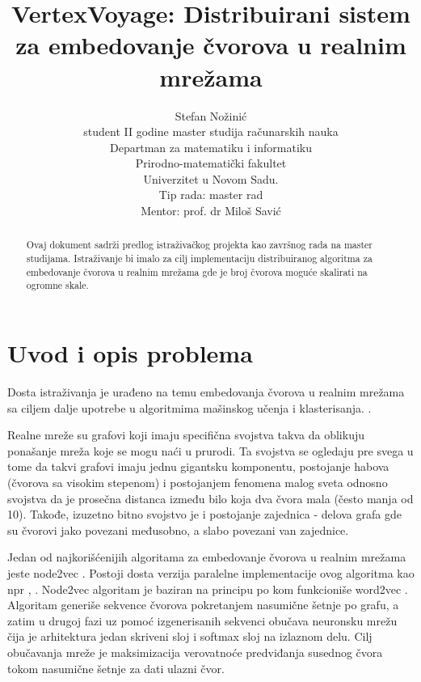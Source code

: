 \documentclass[]{amsart}
\begin{document}
\title{VertexVoyage: Distribuirani sistem za embedovanje čvorova u realnim mrežama}
\author{Stefan Nožinić \\
student II godine master studija računarskih nauka \\
Departman za matematiku i informatiku \\
Prirodno-matematički fakultet \\
Univerzitet u Novom Sadu. \\
Tip rada: master rad \\
Mentor: \MakeLowercase{prof. dr} Miloš Savić
}

\begin{abstract}
    Ovaj dokument sadrži predlog istraživačkog projekta kao završnog rada na master studijama.
    Istraživanje bi imalo za cilj implementaciju distribuiranog algoritma za embedovanje čvorova u realnim mrežama gde je broj čvorova moguće skalirati na ogromne skale.
\end{abstract}


\maketitle
\newpage


\section{Uvod i opis problema}
\label{sec:introduction}

Dosta istraživanja je urađeno na temu embedovanja čvorova u realnim mrežama 
sa ciljem dalje upotrebe u algoritmima mašinskog učenja i klasterisanja. \cite{grover2016node2vec}.

Realne mreže su grafovi koji imaju specifična svojstva takva da oblikuju ponašanje mreža koje se mogu naći u prurodi. Ta svojstva se ogledaju pre svega u tome da takvi grafovi imaju jednu gigantsku komponentu, postojanje habova (čvorova sa visokim stepenom) i postojanjem fenomena malog sveta odnosno svojstva da je prosečna distanca između bilo koja dva čvora mala (često manja od 10). Takođe, izuzetno bitno svojstvo je i postojanje zajednica - delova grafa gde su čvorovi jako povezani međusobno, a slabo povezani van zajednice. 

Jedan od najkorišćenijih algoritama za embedovanje čvorova u realnim mrežama jeste node2vec \cite{grover2016node2vec}. Postoji dosta verzija paralelne implementacije ovog algoritma kao npr \cite{lombardo2019actornode2vec}, \cite{fang2023distributed}. Node2vec algoritam je baziran na principu po kom funkcioniše word2vec \cite{church2017word2vec}. Algoritam generiše sekvence čvorova pokretanjem nasumične šetnje po grafu, a zatim u drugoj fazi uz pomoć izgenerisanih sekvenci obučava neuronsku mrežu čija je arhitektura jedan skriveni sloj i softmax sloj na izlaznom delu. Cilj obučavanja mreže je maksimizacija verovatnoće predviđanja susednog čvora tokom nasumične šetnje za dati ulazni čvor. 
\end{document}
